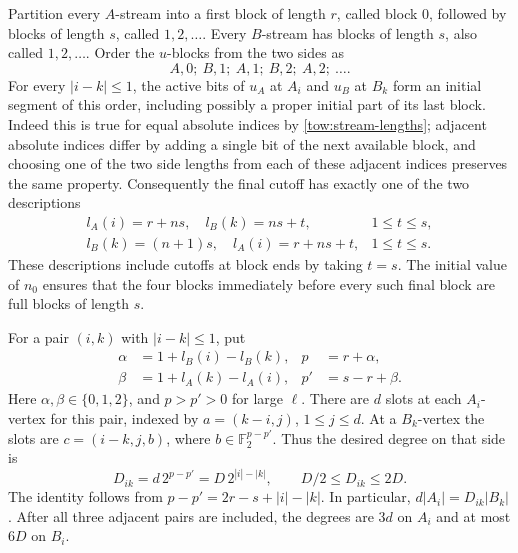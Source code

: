 Partition every \(A\)-stream into a first block of length \(r\), called
block \(0\), followed by blocks of length \(s\), called
\(1,2,\ldots\).  Every \(B\)-stream has blocks of length \(s\), also
called \(1,2,\ldots\).  Order the \(u\)-blocks from the two sides as
\begin{equation}
 A,0;\ B,1;\ A,1;\ B,2;\ A,2;\ \ldots.
 \label{tow:interleaving}
\end{equation}
For every \(|i-k|\leq1\), the active bits of \(u_A\) at \(A_i\) and
\(u_B\) at \(B_k\) form an initial segment of this order, including
possibly a proper initial part of its last block.  Indeed this is true
for equal absolute indices by \eqref{tow:stream-lengths}; adjacent
absolute indices differ by adding a single bit of the next available
block, and choosing one of the two side lengths from each of these
adjacent indices preserves the same property.  Consequently the final
cutoff has exactly one of the two descriptions
\begin{equation}
\begin{array}{ll}
 l_A(i)=r+ns,\quad l_B(k)=ns+t,&1\leq t\leq s,\\
 l_B(k)=(n+1)s,\quad l_A(i)=r+ns+t,&1\leq t\leq s.
\end{array}
\label{tow:two-cutoffs}
\end{equation}
These descriptions include cutoffs at block ends by taking \(t=s\).
The initial value of \(n_0\) ensures that the four blocks immediately
before every such final block are full blocks of length \(s\).

For a pair \((i,k)\) with \(|i-k|\leq1\), put
\begin{equation}
\begin{aligned}
 \alpha&=1+l_B(i)-l_B(k),&p&=r+\alpha,\\
 \beta&=1+l_A(k)-l_A(i),&p'&=s-r+\beta.
\end{aligned}
\label{tow:offsets}
\end{equation}
Here \(\alpha,\beta\in\{0,1,2\}\), and \(p>p'>0\) for large
\(\ell\).  There are \(d\) slots at each \(A_i\)-vertex for this
pair, indexed by \(a=(k-i,j)\), \(1\leq j\leq d\).  At a
\(B_k\)-vertex the slots are
\(c=(i-k,j,b)\), where \(b\in\mathbb F _2^{p-p'}\).
Thus the desired degree on that side is
\begin{equation}
 D_{ik}=d\,2^{p-p'}=D\,2^{|i|-|k|},
 \qquad D/2\leq D_{ik}\leq2D.
 \label{tow:degrees}
\end{equation}
The identity follows from
\(p-p'=2r-s+|i|-|k|\).  In particular,
\(d|A_i|=D_{ik}|B_k|\).  After all three adjacent pairs are included,
the degrees are \(3d\) on \(A_i\) and at most \(6D\) on \(B_i\).

